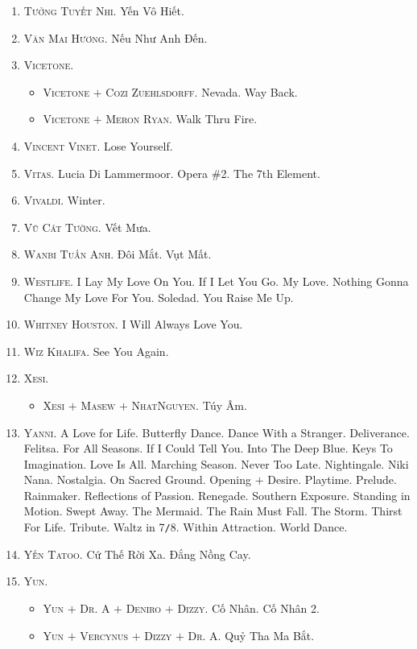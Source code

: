 \documentclass{article}
\begin{document}
\begin{enumerate}
	\item \textsc{Tưởng Tuyết Nhi.} Yến Vô Hiết.
	\item \textsc{Văn Mai Hương.} Nếu Như Anh Đến.
	\item \textsc{Vicetone.}
	\begin{itemize}
		\item \textsc{Vicetone $+$ Cozi Zuehlsdorff.} Nevada. Way Back.
		\item \textsc{Vicetone $+$ Meron Ryan.} Walk Thru Fire.
	\end{itemize}
	\item \textsc{Vincent Vinet.} Lose Yourself.
	\item \textsc{Vitas.} Lucia Di Lammermoor. Opera \#2. The 7th Element.
	\item \textsc{Vivaldi.} Winter.
	\item \textsc{Vũ Cát Tường.} Vết Mưa.
	\item \textsc{Wanbi Tuấn Anh.} Đôi Mắt. Vụt Mất.
	\item \textsc{Westlife.} I Lay My Love On You. If I Let You Go. My Love. Nothing Gonna Change My Love For You. Soledad. You Raise Me Up.
	\item \textsc{Whitney Houston.} I Will Always Love You.
	\item \textsc{Wiz Khalifa.} See You Again.
	\item \textsc{Xesi.}
	\begin{itemize}
		\item \textsc{Xesi $+$ Masew $+$ NhatNguyen.} Túy Âm.
	\end{itemize}
	\item \textsc{Yanni.} A Love for Life. Butterfly Dance. Dance With a Stranger. Deliverance. Felitsa. For All Seasons. If I Could Tell You. Into The Deep Blue. Keys To Imagination. Love Is All. Marching Season. Never Too Late. Nightingale. Niki Nana. Nostalgia. On Sacred Ground. Opening $+$ Desire. Playtime. Prelude. Rainmaker. Reflections of Passion. Renegade. Southern Exposure. Standing in Motion. Swept Away. The Mermaid. The Rain Must Fall. The Storm. Thirst For Life. Tribute. Waltz in 7\texttt{/}8. Within Attraction. World Dance.
	\item \textsc{Yến Tatoo.} Cứ Thế Rời Xa. Đắng Nồng Cay.
	\item \textsc{Yun.}
	\begin{itemize}
		\item \textsc{Yun $+$ Dr. A $+$ Deniro $+$ Dizzy.} Cố Nhân. Cố Nhân 2.
		\item \textsc{Yun $+$ Vercynus $+$ Dizzy $+$ Dr. A.} Quỷ Tha Ma Bắt.

\end{itemize}
\end{enumerate}
\end{document}
